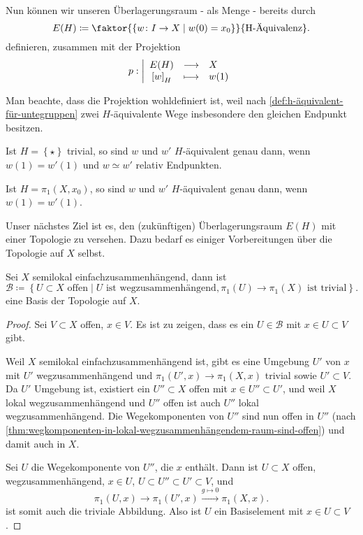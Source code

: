 Nun können wir unseren Überlagerungsraum - als Menge - bereits durch
\[
    E(H) \coloneqq  \faktor{\left \{w\colon  I \to  X \mid  w(0) = x_0\right\} }{\text{H-Äquivalenz}}
.\] 
definieren, zusammen mit der Projektion
    \begin{equation*}
    p: \left| \begin{array}{c c l} 
        E(H) & \longrightarrow & X \\
        \left[w\right]_H & \longmapsto &  w(1)
    \end{array} \right.
\end{equation*}

\begin{remark*}
    Man beachte, dass die Projektion wohldefiniert ist, weil nach \autoref{def:h-äquivalent-für-untegruppen} zwei $H$-äquivalente Wege insbesondere den gleichen Endpunkt besitzen. 
\end{remark*}


 \begin{example}
     Ist $H = \left \{\star\right\} $ trivial, so sind $w$ und  $w'$  $H$-äquivalent genau dann, wenn  $w(1) = w'(1)$ und  $w \simeq w'$ relativ Endpunkten.

     Ist  $H = \pi_1(X,x_0)$, so sind $w$ und  $w'$  $H$-äquivalent genau dann, wenn  $w(1) = w'(1)$.
\end{example}

Unser nächstes Ziel ist es, den (zukünftigen) Überlagerungsraum $E(H)$ mit einer Topologie zu versehen. Dazu bedarf es einiger Vorbereitungen über die Topologie auf $X$ selbst.

\begin{lemma}\label{lm:basis-vonsemilokal-einfachzusammenhängendem-zusammenhängendem-raum}
    Sei $X$ semilokal einfachzusammenhängend, dann ist
     \[
         \mathcal{B} \coloneqq  \left \{U\subset X \text{ offen}\mid  U \text{ ist wegzusammenhängend}, \pi_1(U) \to  \pi_1(X) \text{ ist trivial}\right\} 
    .\] 
    eine Basis der Topologie auf $X$.
\end{lemma}


\begin{proof}
    Sei $V\subset X$ offen, $x\in V$. Es ist zu zeigen, dass es ein $U\in \mathcal{B}$ mit $x\in U\subset V$ gibt. 

    Weil $X$ semilokal einfachzusammenhängend ist, gibt es eine Umgebung  $U'$ von  $x$ mit  $U'$ wegzusammenhängend und $\pi_1(U',x) \to  \pi_1(X,x)$ trivial sowie $U'\subset V$. Da $U'$ Umgebung ist, existiert ein  $U''\subset X$ offen mit $x\in U'' \subset U'$, und weil $X$ lokal wegzusammenhängend und  $U''$ offen ist auch  $U''$ lokal wegzusammenhängend. Die Wegekomponenten von  $U''$ sind nun offen in  $U''$ (nach  \autoref{thm:wegkomponenten-in-lokal-wegzusammenhängendem-raum-sind-offen}) und damit auch in $X$. 

    Sei $U$ die Wegekomponente von  $U''$, die  $x$ enthält. Dann ist  $U\subset X$ offen, wegzusammenhängend, $x\in U$, $U\subset U''\subset U'\subset V$, und
    \[
        \pi_1(U,x) \to  \pi_1(U',x) \stackrel{g \mapsto 0}{\longrightarrow}   \pi_1(X,x)
    .\] 
    ist somit auch die triviale Abbildung. Also ist $U$ ein Basiselement mit $x\in U\subset V$.
\end{proof}

